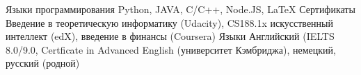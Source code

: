 \begin{cvskills}
  \cvskill
    {Языки программирования}
    {Python, JAVA, C/C++, Node.JS, \LaTeX}
  \cvskill
    {Сертификаты}
    {Введение в теоретическую информатику (Udacity), CS188.1x искусственный интеллект (edX), введение в финансы (Coursera)}
  \cvskill
    {Языки}
    {Английский (IELTS 8.0/9.0, Certficate in Advanced English (университет Кэмбриджа), немецкий, русский (родной)}
\end{cvskills}

